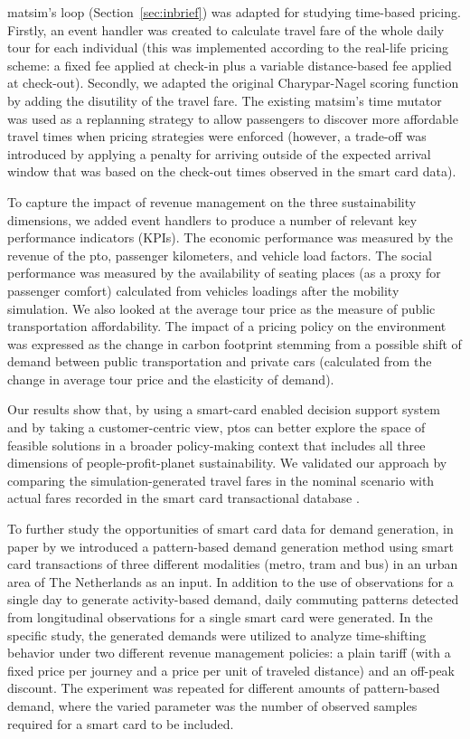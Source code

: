 \gls{matsim}'s loop (Section~\ref{sec:inbrief}) was adapted for studying time-based pricing. Firstly, an event handler was created to calculate travel fare of the whole daily tour for each individual (this was implemented according to the real-life pricing scheme: a fixed fee applied at check-in plus a variable distance-based fee applied at check-out). Secondly, we adapted the original Charypar-Nagel scoring function \citep[][]{CharyparNagel2005ga4acts} by adding the disutility of the travel fare. The existing \gls{matsim}'s time mutator was used as a replanning strategy to allow passengers to discover more affordable travel times when pricing strategies were enforced (however, a trade-off was introduced by applying a penalty for arriving outside of the expected arrival window that was based on the check-out times observed in the smart card data).

To capture the impact of revenue management on the three sustainability dimensions, we added event handlers to produce a number of relevant key performance indicators (KPIs). The economic performance was measured by the revenue of the \gls{pto}, passenger kilometers, and vehicle load factors. The social performance was measured by the availability of seating places (as a proxy for passenger comfort) calculated from vehicles loadings after the mobility simulation. We also looked at the average tour price as the measure of public transportation affordability. The impact of a pricing policy on the environment was expressed as the change in carbon footprint stemming from a possible shift of demand between public transportation and private cars (calculated from the change in average tour price and the elasticity of demand). 

Our results show that, by using a smart-card enabled decision support system and by taking a customer-centric view, \gls{pto}s can better explore the space of feasible solutions in a broader policy-making context that includes all three dimensions of people-profit-planet sustainability. We validated our approach by comparing the simulation-generated travel fares in the nominal scenario with actual fares recorded in the smart card transactional database \citep[see][]{LovricEtAl_DSS_2013}.

To further study the opportunities of smart card data for demand generation, in paper by \citet[][]{BoumanEtAl_AAMAS_2012} we introduced a pattern-based demand generation method using smart card transactions of three different modalities (metro, tram and bus) in an urban area of The Netherlands as an input. In addition to the use of observations for a single day to generate activity-based demand, daily commuting patterns detected from longitudinal observations for a single smart card were generated. In the specific study, the generated demands were utilized to analyze time-shifting behavior under two different revenue management policies: a plain tariff (with a fixed price per journey and a price per unit of traveled distance) and an off-peak discount. The experiment was repeated for different amounts of pattern-based demand, where the varied parameter was the number of observed samples required for a smart card to be included. 

